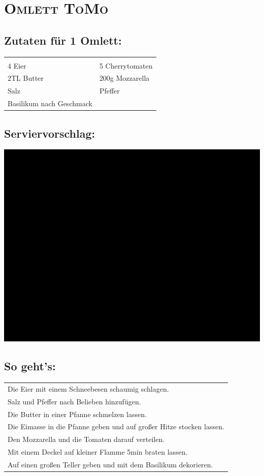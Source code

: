 \section{\textsc{Omlett ToMo}}

\subsection*{Zutaten für 1 Omlett:}

\begin{tabular}{p{7.5cm} p{7.5cm}}
	& \\
	4 Eier & 5 Cherrytomaten \\
	2TL Butter & 200g Mozzarella \\
	Salz & Pfeffer \\
	Basilikum nach Geschmack &
\end{tabular}

\subsection*{Serviervorschlag:}

\includegraphics[width=\textwidth]{img/ph.jpg}

\subsection*{So geht's:}

\begin{tabular}{p{15cm}}
	\\
	Die Eier mit einem Schneebesen schaumig schlagen.\\
	Salz und Pfeffer nach Belieben hinzufügen.\\
	Die Butter in einer Pfanne schmelzen lassen.\\
	Die Eimasse in die Pfanne geben und auf großer Hitze stocken lassen.\\
	Den Mozzarella und die Tomaten darauf verteilen.\\
	Mit einem Deckel auf kleiner Flamme 5min braten lassen.\\
	Auf einen großen Teller geben und mit dem Basilikum dekorieren.\\
\end{tabular}
